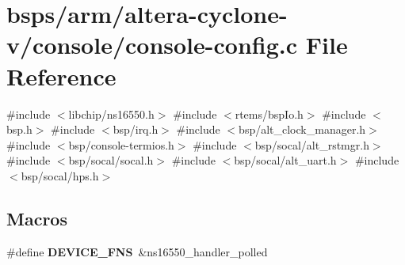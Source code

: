 \hypertarget{arm_2altera-cyclone-v_2console_2console-config_8c}{}\section{bsps/arm/altera-\/cyclone-\/v/console/console-\/config.c File Reference}
\label{arm_2altera-cyclone-v_2console_2console-config_8c}
{\ttfamily \#include $<$libchip/ns16550.\+h$>$}\newline
{\ttfamily \#include $<$rtems/bsp\+Io.\+h$>$}\newline
{\ttfamily \#include $<$bsp.\+h$>$}\newline
{\ttfamily \#include $<$bsp/irq.\+h$>$}\newline
{\ttfamily \#include $<$bsp/alt\+\_\+clock\+\_\+manager.\+h$>$}\newline
{\ttfamily \#include $<$bsp/console-\/termios.\+h$>$}\newline
{\ttfamily \#include $<$bsp/socal/alt\+\_\+rstmgr.\+h$>$}\newline
{\ttfamily \#include $<$bsp/socal/socal.\+h$>$}\newline
{\ttfamily \#include $<$bsp/socal/alt\+\_\+uart.\+h$>$}\newline
{\ttfamily \#include $<$bsp/socal/hps.\+h$>$}\newline
\subsection*{Macros}
\begin{DoxyCompactItemize}
\item 
\mbox{\label{arm_2altera-cyclone-v_2console_2console-config_8c_aa1e88fec2a0add03b025c33d9c965738}} 
\#define {\bfseries D\+E\+V\+I\+C\+E\+\_\+\+F\+NS}~\&ns16550\+\_\+handler\+\_\+polled
\end{DoxyCompactItemize}
